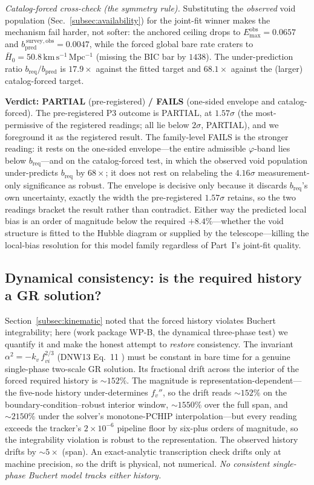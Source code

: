 \documentclass[aps,prd,twocolumn,nofootinbib,superscriptaddress,floatfix]{revtex4-2}
\newcommand{\Hbaro}{\bar H_{0}}
\newcommand{\fv}{f_{v}}
\newcommand{\kmsmpc}{\,\mathrm{km\,s^{-1}\,Mpc^{-1}}}
\newcommand{\bpred}{b_{\mathrm{pred}}}
\newcommand{\breq}{b_{\mathrm{req}}}
\newcommand{\Emax}{E_{\max}}
\begin{document}
\emph{Catalog-forced cross-check (the symmetry rule).} Substituting the
\emph{observed} void population (Sec.~\ref{subsec:availability}) for the joint-fit
winner makes the mechanism fail harder, not softer: the anchored ceiling drops to
$\Emax^{\mathrm{obs}}=0.0657$ and $\bpred^{\,\mathrm{survey,obs}}=0.0047$, while
the forced global bare rate craters to $\Hbaro=50.8\kmsmpc$ (missing the BIC bar
by $1438$). The under-prediction ratio $\breq/\bpred$ is $17.9\times$ against the
fitted target and $68.1\times$ against the (larger) catalog-forced target.

\textbf{Verdict: PARTIAL} (pre-registered) \textbf{/ FAILS} (one-sided envelope and
catalog-forced). The pre-registered P3 outcome is PARTIAL, at $1.57\sigma$ (the
most-permissive of the registered readings; all lie below $2\sigma$, PARTIAL), and we
foreground it as the registered result. The family-level FAILS is the stronger
reading: it rests on the one-sided envelope---the entire admissible $\varphi$-band
lies below $\breq$---and on the catalog-forced test, in which the observed void
population under-predicts $\breq$ by $68\times$; it does not rest on relabeling the
$4.16\sigma$ measurement-only significance as robust. The envelope is decisive only
because it discards $\breq$'s own uncertainty, exactly the width the pre-registered
$1.57\sigma$ retains, so the two readings bracket the result rather than
contradict. Either way the predicted local bias is an order of magnitude below the
required $+8.4\%$---whether the void structure is fitted to the Hubble diagram or
supplied by the telescope---killing the local-bias resolution for this model family
regardless of Part~I's joint-fit quality.

\subsection{Dynamical consistency: is the required history a GR solution?}
\label{subsec:dynamical}

Section~\ref{subsec:kinematic} noted that the forced history violates Buchert
integrability; here (work package WP-B, the dynamical three-phase test) we quantify
it and make the honest attempt to \emph{restore}
consistency. The invariant $\alpha^{2}=-k_v\,f_{vi}^{2/3}$ (DNW13 Eq.~11
\cite{Duley2013}) must be constant in bare time for a genuine single-phase
two-scale GR solution. Its fractional drift across the interior of the forced
required history is $\sim\!152\%$. The magnitude is representation-dependent---the
five-node history under-determines $\fv''$, so the drift reads $\sim\!152\%$ on the
boundary-condition--robust interior window, $\sim\!1550\%$ over the full span, and
$\sim\!2150\%$ under the solver's monotone-PCHIP interpolation---but every reading
exceeds the tracker's $2\times10^{-6}$ pipeline floor by six-plus orders of
magnitude, so the integrability violation is robust to the representation. The
observed history drifts by $\sim\!5\times$ (span). An exact-analytic transcription
check drifts only at machine precision, so the drift is physical, not numerical.
\emph{No consistent single-phase Buchert model tracks either history.}
\end{document}
